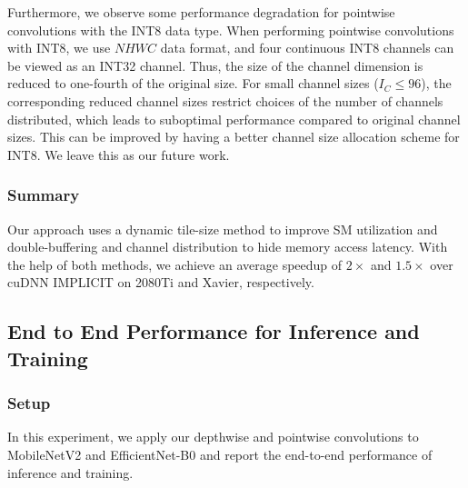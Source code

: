 Furthermore, we observe some performance degradation for pointwise convolutions with the INT8 data type. When performing pointwise
convolutions with INT8, we use $NHWC$ data format, and four continuous INT8 channels can be viewed as an INT32 channel. Thus, the size of
the channel dimension is reduced to one-fourth of the original size. For small channel sizes ($I_C \leq 96$), the corresponding reduced channel
sizes restrict choices of the number of channels distributed, which leads to suboptimal performance compared to original channel sizes.
This can be improved by having a better channel size allocation scheme for INT8. We leave this as our future work.


\subsubsection{Summary} Our approach uses a dynamic tile-size method to improve SM utilization and double-buffering and channel distribution to hide
memory access latency. With the help of both methods, we achieve an average speedup of $2\times$ and $1.5\times$ over cuDNN IMPLICIT on
2080Ti and Xavier, respectively.





\subsection{End to End Performance for Inference and Training}
\label{sec:inferexp}
\subsubsection{Setup}
In this experiment, we apply our depthwise and pointwise convolutions to MobileNetV2 and EfficientNet-B0 and report the end-to-end performance of inference and training.

